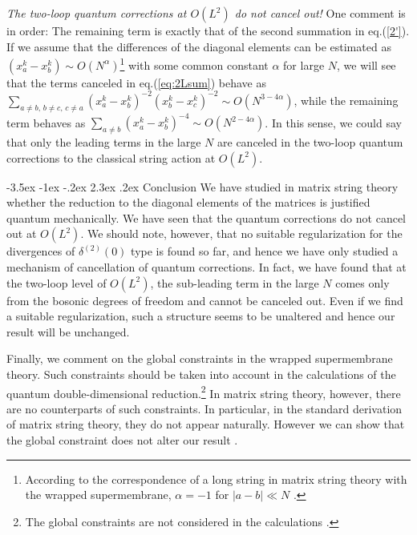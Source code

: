 \documentclass[a4paper,12pt]{article}
\makeatletter
\renewcommand\section{\@startsection {section}{1}{\z@}%
		{-3.5ex \@plus -1ex \@minus -.2ex}%
		{2.3ex \@plus.2ex}%
		{\normalfont\large\bfseries}}
\makeatother
\begin{document}
\textit{The two-loop quantum corrections at $O(L^2)$ do not cancel
out!}  One comment is in order:  The remaining term is exactly
that of the second summation in eq.(\ref{2'}).
If we assume that the differences of the diagonal elements can be
estimated as $(x_a^k-x_b^k)\sim O(N^{\alpha})$\footnote{According to
the correspondence of a long string in matrix string theory
with the wrapped supermembrane, $\alpha=-1$ for $|a-b|\ll N$
\cite{SY}.} with some common constant $\alpha$ for large $N$,
we will see that the terms canceled in eq.(\ref{eq:2Lsum})
behave as $\sum_{a\ne b,\,b\ne c,\,c\ne a} (x_a^k-x_b^k)^{-2}
(x_b^k-x_c^k)^{-2} \sim O(N^{3-4\alpha})$, while the remaining term
behaves as $\sum_{a\ne b} (x_a^k-x_b^k)^{-4}\sim O(N^{2-4\alpha})$.
In this sense, we could say that only the leading terms in the large
$N$ are canceled in the two-loop quantum corrections to the
classical string action at $O(L^2)$.

\section{Conclusion}
We have studied in matrix string theory whether the reduction to
the diagonal elements of the matrices is justified quantum
mechanically. We have seen that the quantum corrections do not cancel
out at $O(L^2)$. We should note, however, that no suitable
regularization for the divergences of $\delta^{(2)}(0)$ type is found
so far, and hence we have only studied a mechanism of cancellation of
quantum corrections.
In fact, we have found that at the two-loop level of $O(L^2)$,
the sub-leading term in the large $N$ comes only from the bosonic
degrees of freedom and cannot be canceled out.
Even if we find a suitable regularization, such a structure seems to
be unaltered and hence our result will be unchanged.

Finally, we comment on the global constraints in the wrapped
supermembrane theory.
Such constraints should be taken into account in the calculations of
the quantum double-dimensional reduction.\footnote{The global
constraints are not considered in the calculations \cite{SY}.}
In matrix string theory, however, there are no counterparts of such
constraints.
In particular, in the standard derivation of matrix string theory,
they do not appear naturally.
However we can show that the global constraint does not alter our
result \cite{UY2}.
\end{document}
